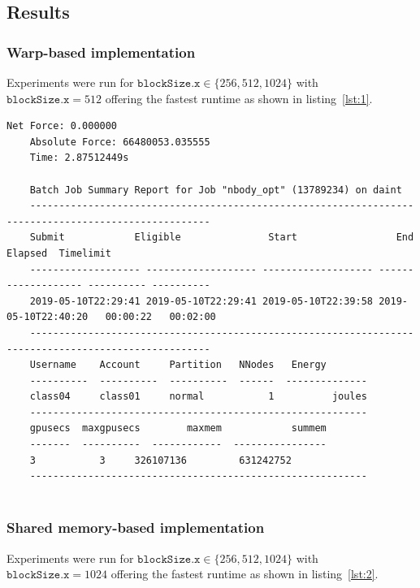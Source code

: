 \documentclass[11pt,a4paper]{article}
\begin{document}
\subsection{Results}
\subsubsection{Warp-based implementation}
Experiments were run for $\texttt{blockSize.x} \in \{256, 512, 1024\}$ with
$\texttt{blockSize.x}= 512$ offering the fastest runtime as shown in listing~\ref{lst:1}.

\begin{lstlisting}[basicstyle=\tiny, frame=single, caption={Task 2: Warp-based force calculation kernel output.}, label={lst:1}]
	Net Force: 0.000000
	Absolute Force: 66480053.035555
	Time: 2.87512449s
	 
	Batch Job Summary Report for Job "nbody_opt" (13789234) on daint
	-----------------------------------------------------------------------------------------------------
	Submit            Eligible               Start                 End    Elapsed  Timelimit 
	------------------- ------------------- ------------------- ------------------- ---------- ---------- 
	2019-05-10T22:29:41 2019-05-10T22:29:41 2019-05-10T22:39:58 2019-05-10T22:40:20   00:00:22   00:02:00 
	-----------------------------------------------------------------------------------------------------
	Username    Account     Partition   NNodes   Energy
	----------  ----------  ----------  ------  --------------
	class04     class01     normal           1          joules
	----------------------------------------------------------
	gpusecs  maxgpusecs        maxmem            summem
	-------  ----------  ------------  ----------------
	3           3     326107136         631242752
	----------------------------------------------------------
	
	\end{lstlisting}

\subsubsection{Shared memory-based implementation}
Experiments were run for $\texttt{blockSize.x} \in \{256, 512, 1024\}$ with
$\texttt{blockSize.x}= 1024$ offering the fastest runtime as shown in listing~\ref{lst:2}.
\end{document}
